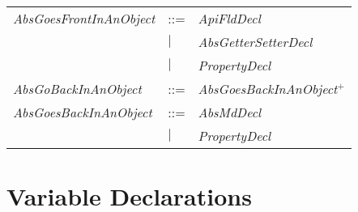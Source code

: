 \begin{tabular}{lll}
\emph{AbsGoesFrontInAnObject}
&::=& \emph{ApiFldDecl} \\
&$|$& \emph{AbsGetterSetterDecl} \\
&$|$& \emph{PropertyDecl} \\

\emph{AbsGoBackInAnObject} &::=& \emph{AbsGoesBackInAnObject}$^+$\\

\emph{AbsGoesBackInAnObject}
&::=& \emph{AbsMdDecl} \\
&$|$& \emph{PropertyDecl} \\

\end{tabular}

\section{Variable Declarations}
